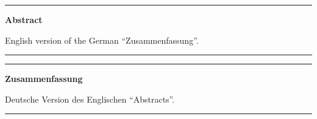 \documentclass[a4paper,11pt,twoside]{ThesisStyle}
\begin{document}



\dominitoc


\cleardoublepage
\begin{vcenterpage}
\noindent\rule[2pt]{\textwidth}{0.5pt}
\begin{center}
{\large\textbf{Abstract\\}}
\end{center}
English version of the German ``Zusammenfassung''.\\
\noindent\rule[2pt]{\textwidth}{0.5pt}
\end{vcenterpage}

\clearpage
\begin{vcenterpage}
\noindent\rule[2pt]{\textwidth}{0.5pt}
\begin{center}
{\large\textbf{Zusammenfassung\\}}
\end{center}
Deutsche Version des Englischen ``Abstracts''.\\
\noindent\rule[2pt]{\textwidth}{0.5pt}
\end{vcenterpage}



\tableofcontents

\mainmatter







\appendix






\end{document}
